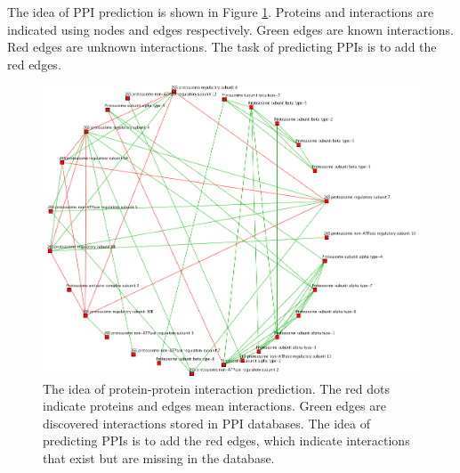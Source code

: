 The idea of PPI prediction is shown in Figure \ref{fig_ppi_pred}. Proteins and interactions are indicated using nodes and edges respectively. Green edges are known interactions. Red edges are unknown interactions. The task of predicting PPIs is to add the red edges. 
\begin{figure}[h!]
\begin{center}
\includegraphics[width=12cm]{img/network.png}
\end{center}
\caption[The idea of protein-protein interaction prediction]{The idea of protein-protein interaction prediction. The red dots indicate proteins and edges mean interactions. Green edges are discovered interactions stored in PPI databases. The idea of predicting PPIs is to add the red edges, which indicate interactions that exist but are missing in the database. \label{fig_ppi_pred}}
\end{figure}

